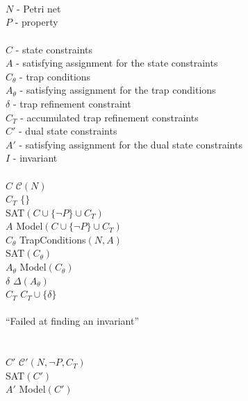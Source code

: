 \begin{figure}
\begin{minipage}[t]{.94\columnwidth}
    \mbox{}\\
    \algFunction \invariantref \\
    \algInput\\
    \tabT $N$ - Petri net \\
    \tabT $P$ - property \\
    \algVars\\
    \tabT $C$ - state constraints \\
    \tabT $A$ - satisfying assignment for the state constraints \\
    \tabT $C_\theta$ - trap conditions \\
    \tabT $A_\theta$ - satisfying assignment for the trap conditions \\
    \tabT $\delta$ - trap refinement constraint \\
    \tabT $C_T$ - accumulated trap refinement constraints \\
    \tabT $C'$ - dual state constraints \\
    \tabT $A'$ - satisfying assignment for the dual state constraints \\
    \tabT $I$ - invariant \\
    \algBegin\\
    \tabT $C$ \algAssgn $\mathcal C(N)$ \\
    \tabT $C_T$ \algAssgn $\{\}$ \\
    \tabT \algWhile SAT$(C \cup \{\neg P\} \cup C_T)$ \algDo \\
    \tabTT $A$ \algAssgn Model$(C \cup \{\neg P\} \cup C_T)$ \\
    \tabTT $C_\theta$ \algAssgn TrapConditions$(N, A)$ \\
    \tabTT \algIf SAT$(C_\theta)$ \algThen \\
    \tabTTT $A_\theta$ \algAssgn Model$(C_\theta)$ \\
    \tabTTT $\delta$ \algAssgn $\Delta(A_\theta)$ \\
    \tabTTT $C_T$ \algAssgn $C_T \cup \{\delta\}$ \\
    \tabTT \algElse \\
    \tabTTT \algReturn ``Failed at finding an invariant'' \\
    \tabTT \algFi \\
    \tabT \algOd \\
    \tabT $C'$ \algAssgn $\mathcal C'(N, \neg P, C_T)$ \\
    \tabT \algIf SAT$(C')$ \algThen \\
    \tabTT $A'$ \algAssgn Model$(C')$ \\

\end{minipage}
\end{figure}
